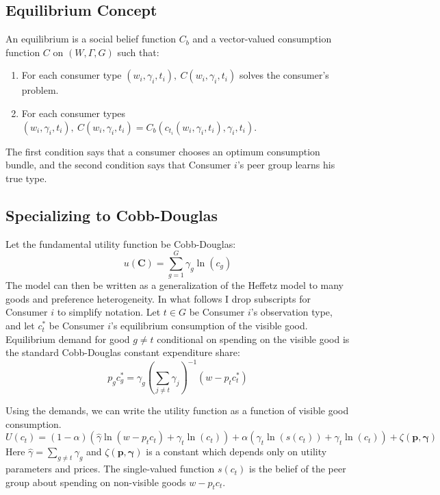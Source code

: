 \subsection{Equilibrium Concept}

An equilibrium is a social belief function $C_b$ and a vector-valued consumption function $C$ on $(W,\Gamma,G)$ such that:
\begin{enumerate}
	\item For each consumer type $(w_i,\gamma_i,t_i), \ C(w_i,\gamma_i,t_i)$ solves the consumer's problem.
    \item For each consumer types $(w_i,\gamma_i,t_i), \ C(w_i,\gamma_i,t_i) = C_b(c_{t_i}(w_i,\gamma_i,t_i),\gamma_i,t_i).$
\end{enumerate}
The first condition says that a consumer chooses an optimum consumption bundle, and the second condition says that Consumer $i$'s peer group learns his true type.

\subsection{Specializing to Cobb-Douglas}

Let the fundamental utility function be Cobb-Douglas:
\[u(\mathbf{C}) = \sum_{g=1}^{G} \gamma_g \ln(c_g)\]
The model can then be written as a generalization of the Heffetz model to many goods and preference heterogeneity.\footnotemark{}
In what follows I drop subscripts for Consumer $i$ to simplify notation. Let $t \in G$ be Consumer $i$'s observation type, and let $c_{t}^*$ be Consumer $i$'s equilibrium consumption of the visible good.  Equilibrium demand for good $g\neq t$ conditional on spending on the visible good is the standard Cobb-Douglas constant expenditure share:
\begin{equation}
    \label{eq:opt_cobb}
    p_g c_g^* = \gamma_g\left(\sum_{j\neq t} \gamma_j\right)^{-1}\left(w-p_t c_t^* \right)
\end{equation}

Using the demands, we can write the utility function as a function of visible good consumption.
\begin{equation}
    \label{eq:ufun}
    U(c_t) = (1-\alpha) \left(\hat{\gamma} \ln \left(w-p_t c_t\right) + \gamma_t \ln \left(c_t \right)\right) + \alpha \left(\gamma_t \ln \left(s(c_t)\right) + \gamma_t \ln \left(c_t\right) \right) + \zeta(\mathbf{p},\boldsymbol{\gamma})
\end{equation}
Here $\hat{\gamma} = \sum_{g\neq t} \gamma_g$ and $\zeta(\mathbf{p},\boldsymbol{\gamma})$ is a constant which depends only on utility parameters and prices.  The single-valued function $s(c_t)$ is the belief of the peer group about spending on non-visible goods $w-p_t c_t$. 

